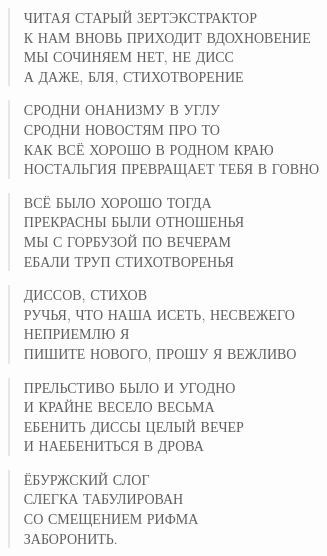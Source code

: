 \poemtitle{***}
\begin{verse}
ЧИТАЯ СТАРЫЙ ЗЕРТЭКСТРАКТОР\\
К НАМ ВНОВЬ ПРИХОДИТ ВДОХНОВЕНИЕ\\
МЫ СОЧИНЯЕМ НЕТ, НЕ ДИСС\\
А ДАЖЕ, БЛЯ, СТИХОТВОРЕНИЕ
\end{verse}

\poemtitle{***}
\begin{verse}
СРОДНИ ОНАНИЗМУ В УГЛУ\\
СРОДНИ НОВОСТЯМ ПРО ТО\\
    КАК ВСЁ ХОРОШО В РОДНОМ КРАЮ\\
НОСТАЛЬГИЯ ПРЕВРАЩАЕТ ТЕБЯ В ГОВНО
\end{verse}

\poemtitle{***}
\begin{verse}
ВСЁ БЫЛО ХОРОШО ТОГДА\\
ПРЕКРАСНЫ БЫЛИ ОТНОШЕНЬЯ\\
МЫ С ГОРБУЗОЙ ПО ВЕЧЕРАМ\\
ЕБАЛИ ТРУП СТИХОТВОРЕНЬЯ
\end{verse}

\poemtitle{***}
\begin{verse}
ДИССОВ, СТИХОВ\\
  РУЧЬЯ, ЧТО НАША ИСЕТЬ, НЕСВЕЖЕГО\\
НЕПРИЕМЛЮ Я\\
  ПИШИТЕ НОВОГО, ПРОШУ Я ВЕЖЛИВО
\end{verse}

\poemtitle{***}
\begin{verse}
ПРЕЛЬСТИВО БЫЛО И УГОДНО\\
И КРАЙНЕ ВЕСЕЛО ВЕСЬМА\\
ЕБЕНИТЬ ДИССЫ ЦЕЛЫЙ ВЕЧЕР\\
И НАЕБЕНИТЬСЯ В ДРОВА
\end{verse}

\poemtitle{***}
\begin{verse}
ЁБУРЖСКИЙ СЛОГ\\
СЛЕГКА ТАБУЛИРОВАН\\
СО СМЕЩЕНИЕМ РИФМА\\
ЗАБОРОНИТЬ.
\end{verse}

